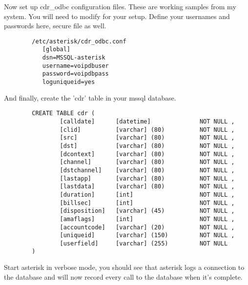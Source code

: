 		Now set up cdr\_odbc configuration files.  These are working samples
		from my system.  You will need to modify for your setup. Define
		your usernames and passwords here, secure file as well.
\begin{astlisting}
\begin{verbatim}
		/etc/asterisk/cdr_odbc.conf
		   [global]
		   dsn=MSSQL-asterisk
		   username=voipdbuser
		   password=voipdbpass
		   loguniqueid=yes
\end{verbatim}
\end{astlisting}
		And finally, create the 'cdr' table in your mssql database.
\begin{astlisting}
\begin{verbatim}
		CREATE TABLE cdr (
		        [calldate]      [datetime]              NOT NULL ,
		        [clid]          [varchar] (80)          NOT NULL ,
		        [src]           [varchar] (80)          NOT NULL ,
		        [dst]           [varchar] (80)          NOT NULL ,
		        [dcontext]      [varchar] (80)          NOT NULL ,
		        [channel]       [varchar] (80)          NOT NULL ,
		        [dstchannel]    [varchar] (80)          NOT NULL ,
		        [lastapp]       [varchar] (80)          NOT NULL ,
		        [lastdata]      [varchar] (80)          NOT NULL ,
		        [duration]      [int]                   NOT NULL ,
		        [billsec]       [int]                   NOT NULL ,
		        [disposition]   [varchar] (45)          NOT NULL ,
		        [amaflags]      [int]                   NOT NULL ,
		        [accountcode]   [varchar] (20)          NOT NULL ,
		        [uniqueid]      [varchar] (150)         NOT NULL ,
		        [userfield]     [varchar] (255)         NOT NULL
		)
\end{verbatim}
\end{astlisting}
		Start asterisk in verbose mode, you should see that asterisk
		logs a connection to the database and will now record every
		call to the database when it's complete.


